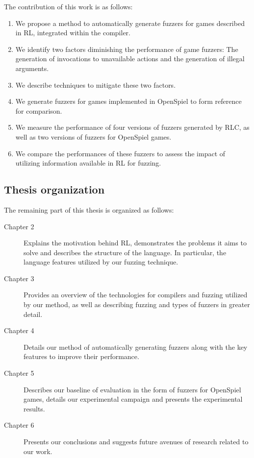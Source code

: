 The contribution of this work is as follows:
\begin{enumerate}
    \item We propose a method to automatically generate fuzzers for games described in RL, integrated within the compiler.
    \item We identify two factors diminishing the performance of game fuzzers: The generation of invocations to unavailable actions and the generation of illegal arguments.
    \item We describe techniques to mitigate these two factors.
    \item We generate fuzzers for games implemented in OpenSpiel to form reference for comparison.
    \item We measure the performance of four versions of fuzzers generated by RLC, as well as two versions of fuzzers for OpenSpiel games.
    \item We compare the performances of these fuzzers to assess the impact of utilizing information available in RL for fuzzing.
\end{enumerate}

\subsection*{Thesis organization}
The remaining part of this thesis is organized as follows:
\begin{description}
    \item [Chapter 2] Explains the motivation behind RL, demonstrates the problems it aims to solve and describes the structure of the language. In particular, the language features utilized by our fuzzing technique.
    \item [Chapter 3] Provides an overview of the technologies for compilers and fuzzing utilized by our method, as well as describing fuzzing and types of fuzzers in greater detail.
    \item [Chapter 4] Details our method of automatically generating fuzzers along with the key features to improve their performance.
    \item [Chapter 5] Describes our baseline of evaluation in the form of fuzzers for OpenSpiel games, details our experimental campaign and presents the experimental results.
    \item [Chapter 6] Presents our conclusions and suggests future avenues of research related to our work. 
\end{description}
